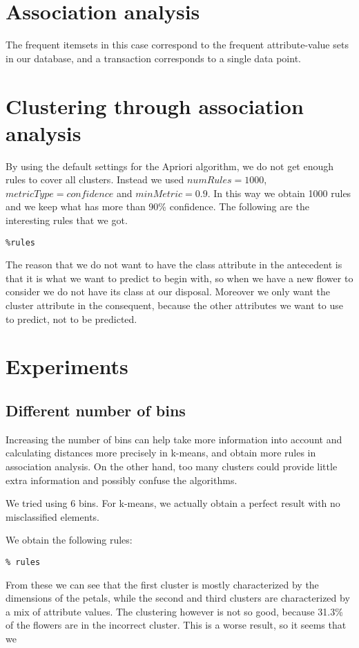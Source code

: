 \documentclass[]{article}
\begin{document}
\section{Association analysis}
The frequent itemsets in this case correspond to the frequent attribute-value sets in our database, and a transaction corresponds to a single data point.

\section{Clustering through association analysis}
By using the default settings for the Apriori algorithm, we do not get enough rules to cover all clusters. Instead we used $numRules=1000$, $metricType=confidence$ and $minMetric=0.9$. In this way we obtain 1000 rules and we keep what has more than 90\% confidence. The following are the interesting rules that we got.
\begin{lstlisting}
%rules
\end{lstlisting}
The reason that we do not want to have the class attribute in the antecedent is that it is what we want to predict to begin with, so when we have a new flower to consider we do not have its class at our disposal. Moreover we only want the cluster attribute in the consequent, because the other attributes we want to use to predict, not to be predicted.

\section{Experiments}

\subsection{Different number of bins}
Increasing the number of bins can help take more information into account and calculating distances more precisely in k-means, and obtain more rules in association analysis. On the other hand, too many clusters could provide little extra information and possibly confuse the algorithms. 

We tried using 6 bins. For k-means, we actually obtain a perfect result with no misclassified elements.

We obtain the following rules:
\begin{lstlisting}
% rules
\end{lstlisting}
From these we can see that the first cluster is mostly characterized by the dimensions of the petals, while the second and third clusters are characterized by a mix of attribute values. The clustering however is not so good, because 31.3\% of the flowers are in the incorrect cluster. This is a worse result, so it seems that we 
\end{document}
